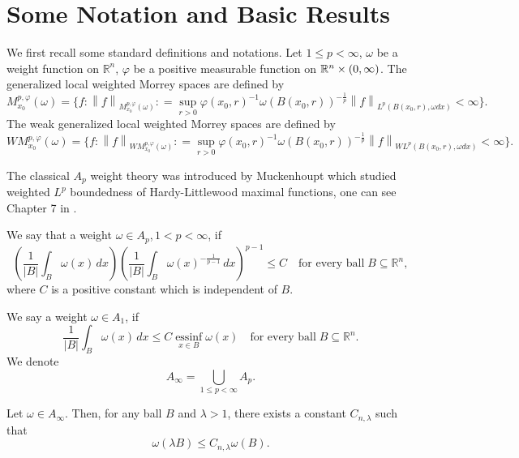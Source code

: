 \documentclass[11pt, twoside, leqno]{article}
\begin{document}
\section{Some Notation and Basic Results}\label{sec2}

We first recall some standard definitions and notations.  Let $1 \le p<\infty$, $\omega$ be a weight function on $\mathbb R^n$, $\varphi$ be a positive measurable function on ${\mathbb R^n} \times \left( {0,\infty } \right)$. The generalized local weighted Morrey spaces are defined by
\begin{equation*}
M_{{x_0}}^{p,\varphi }(\omega ) = \{ f:{\left\| f \right\|_{M_{{x_0}}^{p,\varphi }(\omega )}}: = \mathop {\sup }\limits_{r > 0} \varphi {({x_0},r)^{ - 1}}\omega {(B({x_0},r))^{ - \frac{1}{p}}}{\left\| f \right\|_{{L^p}(B({x_0},r),\omega dx)}} < \infty \}.
\end{equation*}
The weak generalized local weighted Morrey spaces are defined by
\begin{equation*}
WM_{{x_0}}^{p,\varphi }(\omega ) = \{ f:{\left\| f \right\|_{WM_{{x_0}}^{p,\varphi }(\omega )}}: = \mathop {\sup }\limits_{r > 0} \varphi {({x_0},r)^{ - 1}}\omega {(B({x_0},r))^{ - \frac{1}{p}}}{\left\| f \right\|_{{WL^p}(B({x_0},r),\omega dx)}} < \infty \}.
\end{equation*}





The classical $A_p$ weight theory was introduced by Muckenhoupt which studied weighted $L^p$ boundedness of Hardy-Littlewood maximal functions, one can see Chapter 7 in \cite{Gra1}.
\begin{defn}
	We say that a weight $\omega\in A_p$,\,$1<p<\infty$, if
	$$\left(\frac1{|B|}\int_B \omega(x)\,dx\right)\left(\frac1{|B|}\int_B \omega(x)^{-\frac{1}{p-1}}\,dx\right)^{p-1}\le C \quad\mbox{for every ball}\; B\subseteq \mathbb R^n,$$ where $C$ is a positive constant which is independent of $B$.
	
	
	We say a weight $\omega\in A_1$, if
	$$\frac1{|B|}\int_B \omega(x)\,dx\le C\mathop {ess\inf }\limits_{x \in B} \omega(x)\quad\mbox{for every ball}\;B\subseteq\mathbb R^n.$$
	We denote $${A_\infty } = \bigcup\limits_{1 \le p < \infty } {{A_p}}.$$
\end{defn}

\begin{lem}\label{Gra1.1}
	Let $\omega\in {A_\infty }$. Then, for any ball $B$ and $\lambda>1$, there exists a constant ${C_{n,\lambda }}$ such that
	\begin{equation*}
	\omega (\lambda B) \le {C_{n,\lambda }}\omega (B).
	\end{equation*}
\end{lem}
\end{document}
